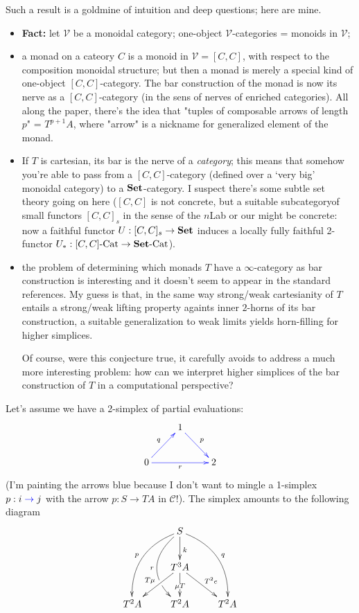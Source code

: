 \documentclass{amsart}
\begin{document}
Such a result is a goldmine of intuition and deep questions; here are mine.
\begin{itemize}
  \item {\bf Fact:} let $\mathcal V$ be a monoidal category; one-object $\mathcal V$-categories = monoids in $\mathcal V$;
\item a monad on a cateory $C$ is a monoid in $\mathcal V =[C,C]$, with respect to the composition monoidal structure; but then a monad is merely a special kind of one-object $[C,C]$-category. The bar construction of the monad is now its nerve as a $[C,C]$-category (in the sens of nerves of enriched categories). All along the paper, there's the idea that "tuples of composable arrows of length $p$" = $T^{p+1}A$, where "arrow" is a nickname for generalized element of the monad.
\item If $T$ is cartesian, its bar is the nerve of a \emph{category}; this means that somehow you're able to pass from a $[C,C]$-category (defined over a `very big' monoidal category) to a $\bf Set$-category. I suspect there's some subtle set theory going on here ($[C,C]$ is not concrete, but a suitable subcategoryof small functors $[C,C]_s$ in the sense of the $n$Lab or our \cite{yosegi} might be concrete: now a faithful functor $U : [C,C]_s\to \bf Set$ induces a locally fully faithful 2-functor $U_* : [C,C]\text{-Cat}\to {\bf Set}\text{-Cat}$).
\item the problem of determining which monads $T$ have a $\infty$-category as bar construction is interesting and it doesn't seem to appear in the standard references. My guess is that, in the same way strong/weak cartesianity of $T$ entails a strong/weak lifting property againts inner $2$-horns of its bar construction, a suitable generalization to weak limits yields horn-filling for higher simplices.

Of course, were this conjecture true, it carefully avoids to address a much more interesting problem: how can we interpret higher simplices of the bar construction of $T$ in a computational perspective?
\end{itemize}
Let's assume we have a 2-simplex of partial evaluations:
\[
\xymatrix{
 &1\ar@[blue][dr]^p&\\
0 \ar@[blue][rr]_r \ar@[blue][ur]^q && 2
}\]
(I'm painting the arrows blue because I don't want to mingle a 1-simplex $p : i \mathrel{\textcolor{blue}{\to}} j$ with the arrow $p : S \to TA$ in $\mathcal C$!). The simplex amounts to the following diagram
\[\xymatrix{
  &S
  \ar@/_1.5pc/[ddl]_p
  \ar@/^1.5pc/[ddr]^q
  \ar@/_2pc/[dd]|(.7)\hole_r
  \ar[d]^k & \\
  &T^3A\ar[dl]_{T\mu}\ar[d]|{\mu T}\ar[dr]^{T^2e}&\\
  T^2 A & T^2A & T^2A
  }
\]
\end{document}
